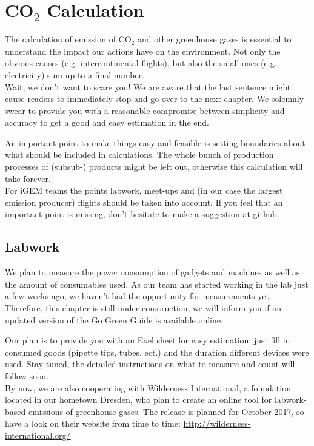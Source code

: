
\chapter{CO$_\text{2}$ Calculation}\label{chap:calculation}

The calculation of emission of CO$_2$ and other greenhouse gases is essential to understand the impact our actions have on the environment. Not only the obvious causes (e.g. intercontinental flights), but also the small ones (e.g. electricity) sum up to a final number. \\
Wait, we don't want to scare you! We are aware that the last sentence might cause readers to immediately stop and go over to the next chapter.  We solemnly swear to provide you with a reasonable compromise between simplicity and accuracy to get a good and easy estimation in the end. 


An important point to make things easy and feasible is setting boundaries about what should be included in calculations. The whole bunch of production processes of (subsub-) products might be left out, otherwise this calculation will take forever. \\
For iGEM teams the points labwork, meet-ups and (in our case the largest emission producer) flights should be taken into account. If you feel that an important point is missing, don't hesitate to make a suggestion at github. 

\section{Labwork}

We plan to measure the power consumption of gadgets and machines as well as the amount of consumables used. As our team has started working in the lab just a few weeks ago, we haven't had the opportunity for measurements yet. Therefore, this chapter is still under construction, we will inform you if an updated version of the Go Green Guide is available online.


Our plan is to provide you with an Exel sheet for easy estimation: just fill in consumed goods (pipette tips, tubes, ect.) and the duration different devices were used. Stay tuned, the detailed instructions on what to measure and count will follow soon.\\
By now, we are also cooperating with Wilderness International, a foundation located in our hometown Dresden, who plan to create an online tool for labwork-based emissions of greenhouse gases. The release is planned for October 2017, so  have a look on their website from time to time: 
\url{http://wilderness-international.org/}

